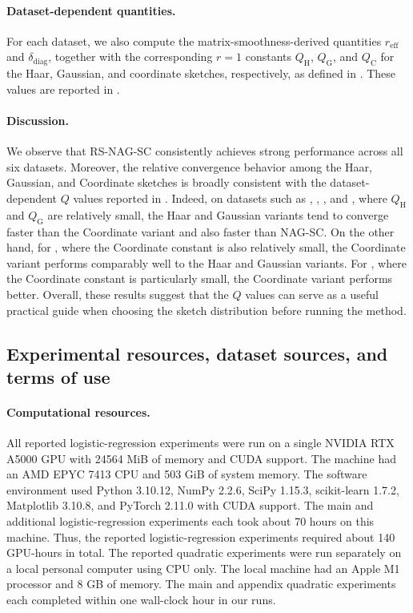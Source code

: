 \documentclass[10pt]{article}
\begin{document}
\paragraph{Dataset-dependent quantities.}
For each dataset, we also compute the matrix-smoothness-derived quantities
$r_{\mathrm{eff}}$ and $\delta_{\mathrm{diag}}$, together with the corresponding $r=1$ constants
$Q_{\mathrm H}$, $Q_{\mathrm G}$, and $Q_{\mathrm C}$ for the Haar, Gaussian, and coordinate sketches, respectively, as defined in .
These values are reported in .

\paragraph{Discussion.}
We observe that RS-NAG-SC consistently achieves strong performance across all six datasets.
Moreover, the relative convergence behavior among the Haar, Gaussian, and Coordinate sketches is broadly consistent with the dataset-dependent $Q$ values reported in .
Indeed, on datasets such as , , , and , where $Q_{\mathrm H}$ and $Q_{\mathrm G}$ are relatively small, the Haar and Gaussian variants tend to converge faster than the Coordinate variant and also faster than NAG-SC.
On the other hand, for , where the Coordinate constant is also relatively small, the Coordinate variant performs comparably well to the Haar and Gaussian variants.
For , where the Coordinate constant is particularly small, the Coordinate variant performs better.
Overall, these results suggest that the $Q$ values can serve as a useful practical guide when choosing the sketch distribution before running the method.


\subsection{Experimental resources, dataset sources, and terms of use}



\paragraph{Computational resources.}
All reported logistic-regression experiments were run on a single NVIDIA RTX
A5000 GPU with 24564 MiB of memory and CUDA support. The machine had an AMD
EPYC 7413 CPU and 503 GiB of system memory. The software environment used
Python 3.10.12, NumPy 2.2.6, SciPy 1.15.3, scikit-learn 1.7.2, Matplotlib
3.10.8, and PyTorch 2.11.0 with CUDA support. The main and additional logistic-regression experiments each took about
70 hours on this machine. 
Thus, the reported logistic-regression
experiments required about 140 GPU-hours in total.
The reported quadratic experiments were run separately on a local personal
computer using CPU only. The local machine had an Apple M1 processor and 8 GB
of memory. The main and appendix quadratic experiments each completed within
one wall-clock hour in our runs.
\end{document}
